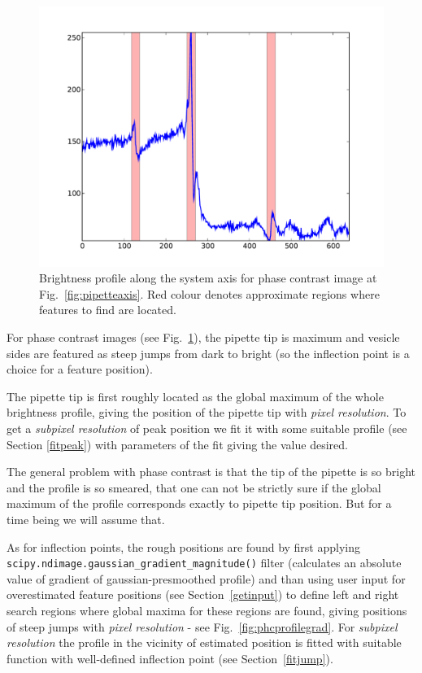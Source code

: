 \documentclass[a4paper,12pt]{article}
\begin{document}
\begin{figure}%
\includegraphics[width=\columnwidth]{figs/phcaxisprofile.pdf}%
\caption{Brightness profile along the system axis for phase contrast image at Fig.~\ref{fig:pipetteaxis}. Red colour denotes approximate regions where features to find are located.}%
\label{fig:phcaxisprofile}%
\end{figure}

For phase contrast images (see Fig.~\ref{fig:phcaxisprofile}), the pipette tip is maximum and vesicle sides are featured as steep jumps from dark to bright (so the inflection point is a choice for a feature position). 

The pipette tip is first roughly located as the global maximum of the whole brightness profile, giving the position of the pipette tip with \emph{pixel resolution}. To get a \emph{subpixel resolution} of peak position we fit it with some suitable profile (see Section \ref{fitpeak}) with parameters of the fit giving the value desired.

The general problem with phase contrast is that the tip of the pipette is so bright and the profile is so smeared, that one can not be strictly sure if the global maximum of the profile corresponds exactly to pipette tip position. But for a time being we will assume that.

As for inflection points, the rough positions are found by first applying \verb|scipy.ndimage.gaussian_gradient_magnitude()| filter (calculates an absolute value of gradient of gaussian-presmoothed profile) and than using user input for overestimated feature positions (see Section~\ref{getinput}) to define left and right search regions where global maxima for these regions are found, giving positions of steep jumps with \emph{pixel resolution} - see Fig.~\ref{fig:phcprofilegrad}. For \emph{subpixel resolution} the profile in the vicinity of estimated position is fitted with suitable function with well-defined inflection point (see Section~\ref{fitjump}).
\end{document}

